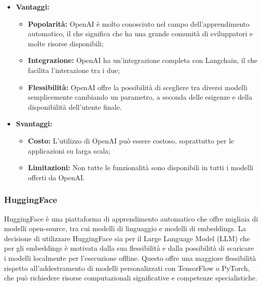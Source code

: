 \documentclass[10pt, a4paper]{article}
\begin{document}
\begin{itemize}
\item \textbf{Vantaggi:}
\begin{itemize}
\item \textbf{Popolarità:} OpenAI è molto conosciuto nel campo dell'apprendimento automatico, il che significa che ha una grande comunità di sviluppatori e molte risorse disponibili;
\item \textbf{Integrazione:} OpenAI ha un'integrazione completa con Langchain, il che facilita l'interazione tra i due;
\item \textbf{Flessibilità:} OpenAI offre la possibilità di scegliere tra diversi modelli semplicemente cambiando un parametro, a seconda delle esigenze e della disponibilità dell'utente finale.
\end{itemize}
\item \textbf{Svantaggi:}
\begin{itemize}
\item \textbf{Costo:} L'utilizzo di OpenAI può essere costoso, soprattutto per le applicazioni su larga scala;
\item \textbf{Limitazioni:} Non tutte le funzionalità sono disponibili in tutti i modelli offerti da OpenAI.
\end{itemize}
\end{itemize}

\subsubsection{HuggingFace}
HuggingFace è una piattaforma di apprendimento automatico che offre migliaia di modelli open-source, tra cui modelli di linguaggio e modelli di embeddings. La decisione di utilizzare HuggingFace sia per il Large Language Model (LLM) che per gli embeddings è motivata dalla sua flessibilità e dalla possibilità di scaricare i modelli localmente per l’esecuzione offline. Questo offre una maggiore flessibilità rispetto all’addestramento di modelli personalizzati con TensorFlow o PyTorch, che può richiedere risorse computazionali significative e competenze specialistiche.
\end{document}
